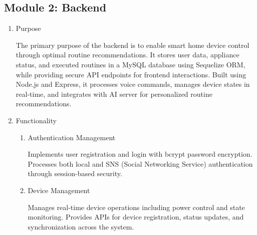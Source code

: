 \documentclass[conference]{IEEEtran}
\begin{document}
\vspace{0.7em} %

\subsection{Module 2: Backend}
\vspace{0.5em}

\begin{enumerate}[label=\arabic*]
    \item Purpose\par
    \vspace{0.3em}
    The primary purpose of the backend is to enable smart home device control through optimal routine recommendations. It stores user data, appliance status, and executed routines in a MySQL database using Sequelize ORM, while providing secure API endpoints for frontend interactions. Built using Node.js and Express, it processes voice commands, manages device states in real-time, and integrates with AI server for personalized routine recommendations. 

    \vspace{1em}

    \item Functionality\par
    \vspace{0.3em}

    \begin{enumerate}[label=\arabic*)]   
        \item Authentication Management\par
        \vspace{0.3em}
        Implements user registration and login with bcrypt password encryption. Processes both local and SNS (Social Networking Service) authentication through session-based security.

        \vspace{1em}

        \item Device Management\par
        \vspace{0.3em}
        Manages real-time device operations including power control and state monitoring. Provides APIs for device registration, status updates, and synchronization across the system.

        \vspace{1em}


\end{enumerate}
\end{enumerate}
\end{document}
